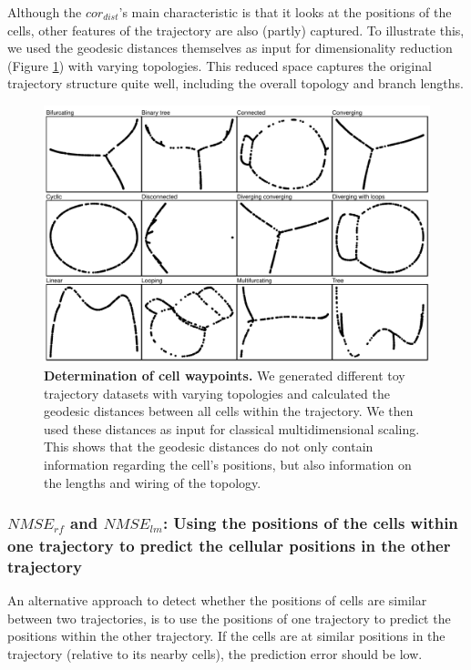 Although the $\textit{cor}_{\textit{dist}}$'s main characteristic is that it looks at the positions of the cells, other features of the trajectory are also (partly) captured. To illustrate this, we used the geodesic distances themselves as input for dimensionality reduction (Figure \ref{fig:snote1fig_6}) with varying topologies. This reduced space captures the original trajectory structure quite well, including the overall topology and branch lengths.

\begin{figure}
	\centering\includegraphics[width=\linewidth]{fig/dynbenchmark/snote1fig_6.pdf}
	\caption{
		\textbf{Determination of cell waypoints.} 
		We generated different toy trajectory datasets with varying topologies and calculated the geodesic distances between all cells within the trajectory. We then used these distances as input for classical multidimensional scaling. This shows that the geodesic distances do not only contain information regarding the cell's positions, but also information on the lengths and wiring of the topology.
	}
	\label{fig:snote1fig_6}
\end{figure}

\subsubsection{$\textit{NMSE}_{\textit{rf}}$ and $\textit{NMSE}_{\textit{lm}}$: Using the positions of the cells within one trajectory to predict the cellular positions in the other trajectory}

An alternative approach to detect whether the positions of cells are similar between two trajectories, is to use the positions of one trajectory to predict the positions within the other trajectory. If the cells are at similar positions in the trajectory (relative to its nearby cells), the prediction error should be low.

